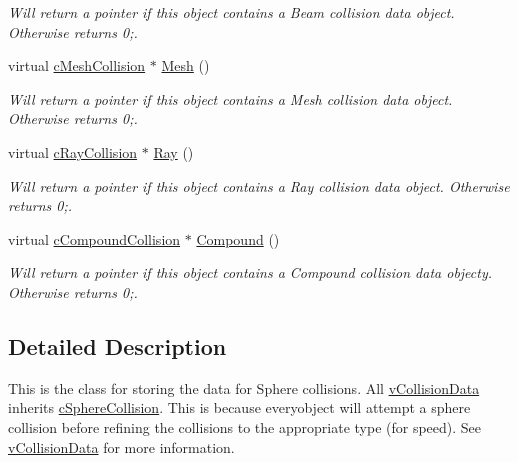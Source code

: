 \begin{DoxyCompactItemize}
\begin{DoxyCompactList}\small\item\em Will return a pointer if this object contains a Beam collision data object. Otherwise returns 0;. \end{DoxyCompactList}\item 
\hypertarget{classc_sphere_collision_a9588e8891b6d9e36eeb8ff71d9bb52b6}{
virtual \hyperlink{classc_mesh_collision}{cMeshCollision} $\ast$ \hyperlink{classc_sphere_collision_a9588e8891b6d9e36eeb8ff71d9bb52b6}{Mesh} ()}
\label{classc_sphere_collision_a9588e8891b6d9e36eeb8ff71d9bb52b6}

\begin{DoxyCompactList}\small\item\em Will return a pointer if this object contains a Mesh collision data object. Otherwise returns 0;. \end{DoxyCompactList}\item 
\hypertarget{classc_sphere_collision_a680cfb0f86757d9ae8aff288e1e42d7d}{
virtual \hyperlink{classc_ray_collision}{cRayCollision} $\ast$ \hyperlink{classc_sphere_collision_a680cfb0f86757d9ae8aff288e1e42d7d}{Ray} ()}
\label{classc_sphere_collision_a680cfb0f86757d9ae8aff288e1e42d7d}

\begin{DoxyCompactList}\small\item\em Will return a pointer if this object contains a Ray collision data object. Otherwise returns 0;. \end{DoxyCompactList}\item 
\hypertarget{classc_sphere_collision_ad4fec7cdbb2d48b3c1e4f9d25ed1fdbe}{
virtual \hyperlink{classc_compound_collision}{cCompoundCollision} $\ast$ \hyperlink{classc_sphere_collision_ad4fec7cdbb2d48b3c1e4f9d25ed1fdbe}{Compound} ()}
\label{classc_sphere_collision_ad4fec7cdbb2d48b3c1e4f9d25ed1fdbe}

\begin{DoxyCompactList}\small\item\em Will return a pointer if this object contains a Compound collision data objecty. Otherwise returns 0;. \end{DoxyCompactList}\end{DoxyCompactItemize}


\subsection{Detailed Description}
This is the class for storing the data for Sphere collisions. All \hyperlink{classv_collision_data}{vCollisionData} inherits \hyperlink{classc_sphere_collision}{cSphereCollision}. This is because everyobject will attempt a sphere collision before refining the collisions to the appropriate type (for speed). See \hyperlink{classv_collision_data}{vCollisionData} for more information. 